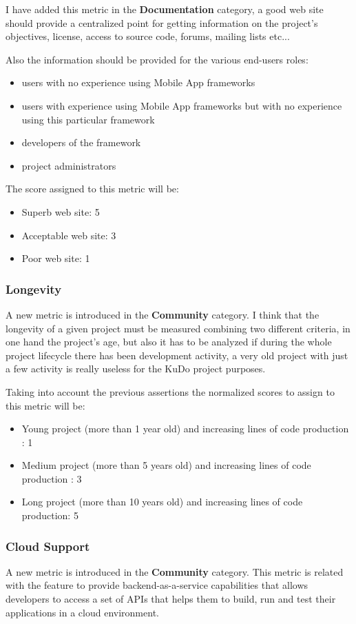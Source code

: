 \documentclass[a4paper,12pt]{book}
\begin{document}
I have added this metric in the \textbf{Documentation} category, a good web site should provide a centralized point for getting information on the project's objectives, license, access to source code, forums, mailing lists etc...

Also the information should be provided for the various end-users roles: 
\begin{itemize}
 \item users with no experience using Mobile App frameworks
 \item users with experience using Mobile App frameworks but with no experience using this particular framework
 \item developers of the framework
 \item project administrators
\end{itemize}

The score assigned to this metric will be:
\begin{itemize}
 \item Superb web site: 5
 \item Acceptable web site: 3
 \item Poor web site: 1
\end{itemize}

\subsubsection{Longevity}
\label{Longevity}
A new metric is introduced in the \textbf{Community} category. I think that the longevity of a given project must be measured combining two different criteria, in one hand the project's age, but also it has to be analyzed if during the whole project lifecycle there has been development activity, a very old project with just a few activity is really useless for the KuDo project purposes.

Taking into account the previous assertions the normalized scores to assign to this metric will be:
\begin{itemize}
 \item Young project (more than 1 year old) and increasing lines of code production : 1
  \item Medium project (more than 5 years old) and increasing lines of code production : 3
 \item Long project (more than 10 years old) and increasing lines of code production: 5
\end{itemize}

\subsubsection{Cloud Support}
\label{Cloud Support}
A new metric is introduced in the \textbf{Community} category. This metric is related with the feature to provide backend-as-a-service capabilities that allows developers to access a set of APIs that helps them to build, run and test their applications in a cloud environment.
\end{document}
